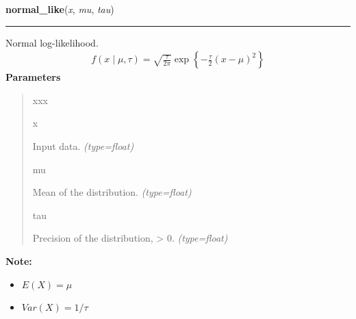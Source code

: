 \hspace{.8\funcindent}\begin{boxedminipage}{\funcwidth}

    \raggedright \textbf{normal\_like}(\textit{x}, \textit{mu}, \textit{tau})

    \vspace{-1.5ex}

    \rule{\textwidth}{1pt}
\setlength{\parskip}{2ex}

Normal log-likelihood.
\begin{equation*}\begin{split}f(x \mid \mu, \tau) = \sqrt{\frac{\tau}{2\pi}} \exp\left\{ -\frac{\tau}{2} (x-\mu)^2 \right\}\end{split}\end{equation*}\setlength{\parskip}{1ex}
      \textbf{Parameters}
      \vspace{-1ex}

      \begin{quote}
        \begin{Ventry}{xxx}

          \item[x]


Input data.
            {\it (type=float)}

          \item[mu]


Mean of the distribution.
            {\it (type=float)}

          \item[tau]


Precision of the distribution, {\textgreater} 0.
            {\it (type=float)}

        \end{Ventry}

      \end{quote}

\textbf{Note:} \begin{itemize}
\item {} 
$E(X) = \mu$

\item {} 
$Var(X) = 1/\tau$

\end{itemize}


    \end{boxedminipage}

    \label{pymc:distributions:one_over_x_like}

    \vspace{0.5ex}

